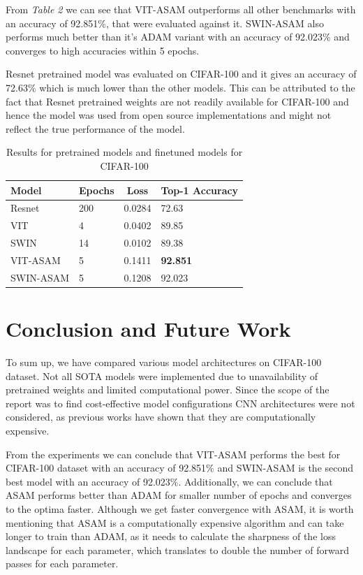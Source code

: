 \documentclass{article}
\begin{document}
From \textit{Table 2} we can see that VIT-ASAM outperforms all other benchmarks with an accuracy of 92.851\%, that were evaluated against it.
SWIN-ASAM also performs much better than it's ADAM variant with an accuracy of 92.023\% and converges to high accuracies within 5 epochs.

Resnet pretrained model was evaluated on CIFAR-100 and it gives an accuracy of 72.63\% which is much lower than the other models.
This can be attributed to the fact that Resnet pretrained weights are not readily available for CIFAR-100 and hence the model was used from open source implementations and might not reflect the true performance of the model.

\begin{table}[ht]
    \begin{tabular}{|l|l|c|l|}
        \hline
        \textbf{Model} & \textbf{Epochs} & \textbf{Loss} & \textbf{Top-1 Accuracy} \\ \hline
        Resnet         & 200             & 0.0284        & 72.63                   \\ \hline
        VIT            & 4               & 0.0402        & 89.85                   \\ \hline
        SWIN           & 14              & 0.0102        & 89.38                   \\ \hline
        VIT-ASAM       & 5               & 0.1411        & \textbf{92.851}         \\ \hline
        SWIN-ASAM      & 5               & 0.1208        & 92.023                  \\ \hline
    \end{tabular}
    \caption{Results for pretrained models and finetuned models for CIFAR-100}
\end{table}


\section{Conclusion and Future Work}
To sum up, we have compared various model architectures on CIFAR-100 dataset.
Not all SOTA models were implemented due to unavailability of pretrained weights and limited computational power.
Since the scope of the report was to find cost-effective model configurations CNN architectures were not considered, as previous works have shown that they are computationally expensive.

From the experiments we can conclude that VIT-ASAM performs the best for CIFAR-100 dataset with an accuracy of 92.851\% and SWIN-ASAM is the second best model with an accuracy of 92.023\%.
Additionally, we can conclude that ASAM performs better than ADAM for smaller number of epochs and converges to the optima faster.
Although we get faster convergence with ASAM, it is worth mentioning that ASAM is a computationally expensive algorithm and can take longer to train than ADAM, as it needs to calculate the sharpness of the loss landscape for each parameter, which translates to double the number of forward passes for each parameter.
\end{document}
